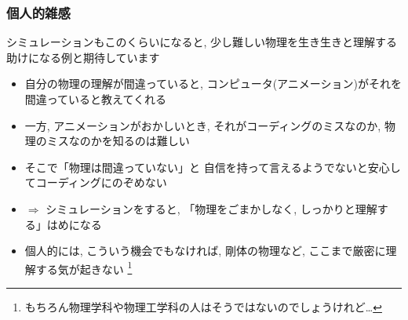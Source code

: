 \documentclass[10pt,dvipdfmx]{beamer}
\newcommand{\aka}[1]{{\color{red}#1}}
\begin{document}
\begin{frame}[fragile]
\frametitle{個人的雑感}
シミュレーションもこのくらいになると, 
\aka{少し難しい物理を生き生きと理解する}助けになる例と期待しています

\begin{itemize}
\item 自分の物理の理解が間違っていると, 
  コンピュータ(アニメーション)がそれを間違っていると教えてくれる

\item 一方, アニメーションがおかしいとき, それがコーディングのミスなのか,
  物理のミスなのかを知るのは難しい

\item そこで「物理は間違っていない」と
  自信を持って言えるようでないと安心してコーディングにのぞめない

\item $\Rightarrow$ シミュレーションをすると,
「物理をごまかしなく, しっかりと理解する」はめになる

\item 個人的には, こういう機会でもなければ,
  剛体の物理など, ここまで厳密に理解する気が起きない
  \footnote{もちろん物理学科や物理工学科の人はそうではないのでしょうけれど\ldots}

\end{itemize}


\end{frame}
\end{document}
